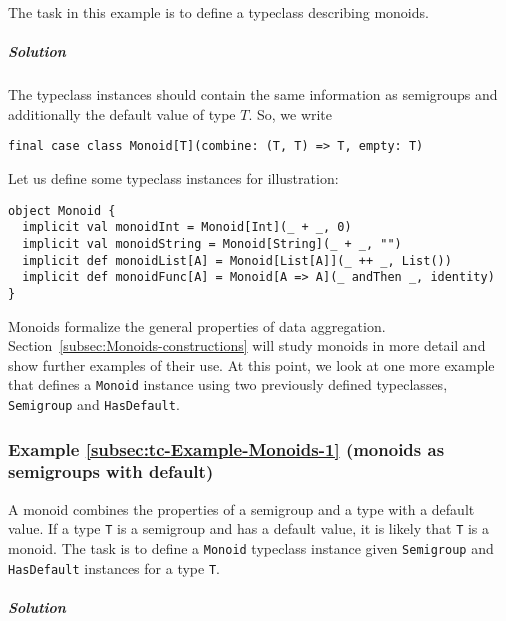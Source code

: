The task in this example is to define a typeclass describing monoids. 

\subparagraph{Solution}

The typeclass instances should
contain the same information as semigroups and additionally the default
value of type $T$. So, we write
\begin{lstlisting}
final case class Monoid[T](combine: (T, T) => T, empty: T)
\end{lstlisting}
Let us define some typeclass instances for illustration:
\begin{lstlisting}
object Monoid {
  implicit val monoidInt = Monoid[Int](_ + _, 0)
  implicit val monoidString = Monoid[String](_ + _, "")
  implicit def monoidList[A] = Monoid[List[A]](_ ++ _, List())
  implicit def monoidFunc[A] = Monoid[A => A](_ andThen _, identity)
}
\end{lstlisting}

Monoids formalize the general properties of data aggregation. Section~\ref{subsec:Monoids-constructions}
will study monoids in more detail and show further examples of their
use. At this point, we look at one more example that defines a \lstinline!Monoid!
instance using two previously defined typeclasses, \lstinline!Semigroup!
and \lstinline!HasDefault!.

\subsubsection{Example \label{subsec:tc-Example-Monoids-1}\ref{subsec:tc-Example-Monoids-1}
(monoids as semigroups with default)}

A monoid combines the properties of a semigroup and a type with a
default value. If a type \lstinline!T! is a semigroup and has a default
value, it is likely that \lstinline!T! is a monoid. The task is to
define a \lstinline!Monoid! typeclass instance given \lstinline!Semigroup!
and \lstinline!HasDefault! instances for a type \lstinline!T!.

\subparagraph{Solution}

